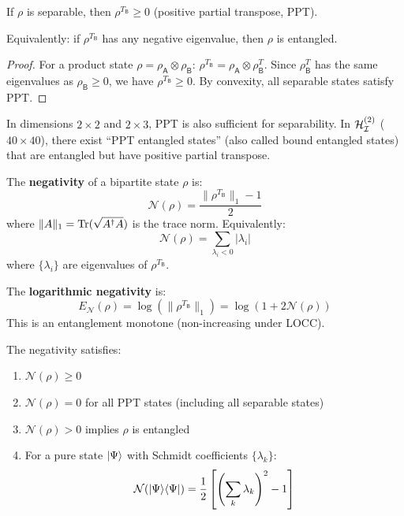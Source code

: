 \begin{theorem}
\label{thm:ppt}
If $\rho$ is separable, then $\rho^{T_\mathsf{B}} \geq 0$ (positive partial transpose, PPT).

Equivalently: if $\rho^{T_\mathsf{B}}$ has any negative eigenvalue, then $\rho$ is entangled.
\end{theorem}

\begin{proof}
For a product state $\rho = \rho_\mathsf{A} \otimes \rho_\mathsf{B}$: $\rho^{T_\mathsf{B}} = \rho_\mathsf{A} \otimes \rho_\mathsf{B}^T$. Since $\rho_\mathsf{B}^T$ has the same eigenvalues as $\rho_\mathsf{B} \geq 0$, we have $\rho^{T_\mathsf{B}} \geq 0$. By convexity, all separable states satisfy PPT.
\end{proof}

\begin{remark}
\label{rem:ppt-not-sufficient}
In dimensions $2 \times 2$ and $2 \times 3$, PPT is also sufficient for separability. In $\mathcal{H}_{\mathcal{I}}^{(2)}$ ($40 \times 40$), there exist ``PPT entangled states'' (also called bound entangled states) that are entangled but have positive partial transpose.
\end{remark}

\begin{definition}[Negativity]
\label{def:negativity}
The \textbf{negativity} of a bipartite state $\rho$ is:
\[
\mathcal{N}(\rho) = \frac{\|\rho^{T_\mathsf{B}}\|_1 - 1}{2}
\]
where $\|A\|_1 = \mathrm{Tr}(\sqrt{A^\dagger A})$ is the trace norm. Equivalently:
\[
\mathcal{N}(\rho) = \sum_{\lambda_i < 0} |\lambda_i|
\]
where $\{\lambda_i\}$ are eigenvalues of $\rho^{T_\mathsf{B}}$.
\end{definition}

\begin{definition}
\label{def:log-negativity}
The \textbf{logarithmic negativity} is:
\[
E_\mathcal{N}(\rho) = \log(\|\rho^{T_\mathsf{B}}\|_1) = \log(1 + 2\mathcal{N}(\rho))
\]
This is an entanglement monotone (non-increasing under LOCC).
\end{definition}

\begin{proposition}
\label{prop:negativity-props}
The negativity satisfies:
\begin{enumerate}
  \item $\mathcal{N}(\rho) \geq 0$
  \item $\mathcal{N}(\rho) = 0$ for all PPT states (including all separable states)
  \item $\mathcal{N}(\rho) > 0$ implies $\rho$ is entangled
  \item For a pure state $|\Psi\rangle$ with Schmidt coefficients $\{\lambda_k\}$:
  \[
  \mathcal{N}(|\Psi\rangle\langle \Psi|) = \frac{1}{2}\left[\left(\sum_k \lambda_k\right)^2 - 1\right]
  \]
\end{enumerate}
\end{proposition}

